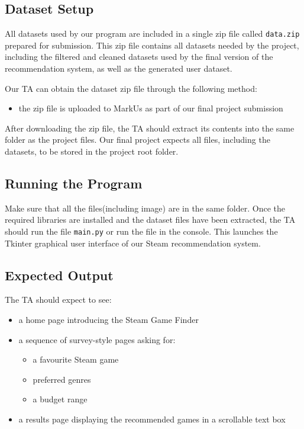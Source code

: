 \documentclass[fontsize=11pt]{article}
\begin{document}
\subsection{Dataset Setup}

All datasets used by our program are included in a single zip file called \texttt{data.zip} prepared for submission. This zip file contains all datasets needed by the project, including the filtered and cleaned datasets used by the final version of the recommendation system, as well as the generated user dataset.


Our TA can obtain the dataset zip file through the following method:
\begin{itemize}
    \item the zip file is uploaded to MarkUs as part of our final project submission
\end{itemize}

After downloading the zip file, the TA should extract its contents into the same folder as the project files. Our final project expects all files, including the datasets, to be stored in the project root folder.

\subsection{Running the Program}

Make sure that all the files(including image) are in the same folder. Once the required libraries are installed and the dataset files have been extracted, the TA should run the file \texttt{main.py} or run the file in the console. This launches the Tkinter graphical user interface of our Steam recommendation system.

\newpage

\subsection{Expected Output}

The TA should expect to see:
\begin{itemize}
    \item a home page introducing the Steam Game Finder
    \item a sequence of survey-style pages asking for:
    \begin{itemize}
        \item a favourite Steam game
        \item preferred genres
        \item a budget range
    \end{itemize}
    \item a results page displaying the recommended games in a scrollable text box
\end{itemize}
\end{document}
